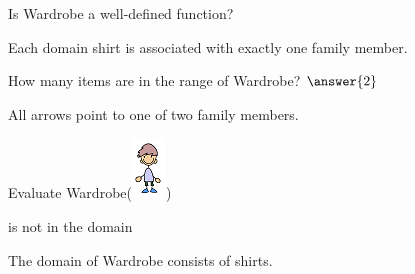 \documentclass{ximera}
\begin{document}
\begin{exercise}
Is Wardrobe a well-defined function?
  \begin{multipleChoice}
  \end{multipleChoice}
  \begin{feedback}
Each domain shirt is associated with exactly one family member.
  \end{feedback}
\end{exercise}





\begin{exercise}
How many items are in the range of Wardrobe? $\answer{2}$
  \begin{feedback}
All arrows point to one of two family members.
  \end{feedback}
\end{exercise}





\begin{exercise}
Evaluate Wardrobe({\includegraphics[width=34px,height=60px]{pics/elements/family/family5.png}})
  \begin{multipleChoice}
     is not in the domain
  \end{multipleChoice}
  \begin{feedback}
The domain of Wardrobe consists of shirts.
  \end{feedback}
\end{exercise}
\end{document}
